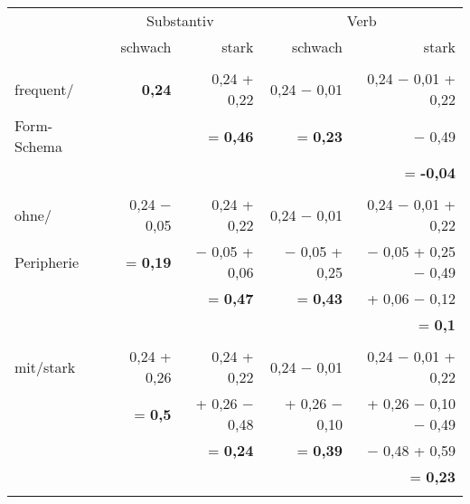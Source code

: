 \begin{table}\small
\begin{tabular}{lrrrr}
\lsptoprule
					&				\multicolumn{2}{c}{Substantiv}&  \multicolumn{2}{c}{Verb}\\\cmidrule(lr){2-3}\cmidrule(lr){4-5}
						&			schwach  & stark									& schwach  & stark  \\
\midrule
&&&& \\
frequent/   & \textbf{0,24}   		& 0,24 + 0,22 & 0,24 − 0,01 & 0,24 − 0,01 + 0,22  \\
Form-Schema&& = \textbf{0,46}	 & = \textbf{0,23}	 & − 0,49  \\
&&&& = \textbf{-0,04} \\
&&&& \\
ohne/  & 0,24 − 0,05  & 0,24 + 0,22   & 0,24 − 0,01  	& 0,24 − 0,01 + 0,22   \\
Peripherie& = \textbf{0,19} & − 0,05 + 0,06 & − 0,05 + 0,25& − 0,05 + 0,25 − 0,49 \\
&&  = \textbf{0,47} &  = \textbf{0,43} &  + 0,06 − 0,12 \\
&&&& = \textbf{0,1}  \\
&&&& \\
mit/stark	& 0,24 + 0,26  &  0,24 + 0,22  	& 0,24 − 0,01  		& 0,24 − 0,01 + 0,22  \\
& = \textbf{0,5} & + 0,26  − 0,48  & + 0,26 − 0,10  & + 0,26 − 0,10 − 0,49\\
&& = \textbf{0,24} & = \textbf{0,39} &   − 0,48 + 0,59 \\
&&&& = \textbf{0,23}\\
\lspbottomrule
\end{tabular}
\label{vglwapredkreuz}
\end{table}
